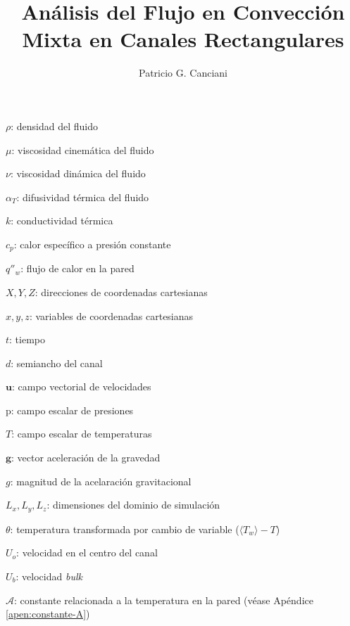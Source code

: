 \documentclass[12pt,screen,twoside]{ibtesis}
\title{Análisis del Flujo en Convección Mixta en Canales Rectangulares}
\author{Patricio G. Canciani}
\begin{document}

\begin{preliminary}



\begin{abreviaturas}
\begin{itemize}
\small{

\item[] $\rho$: densidad del fluido 
\item[] $\mu$: viscosidad cinemática del fluido 
\item[] $\nu$: viscosidad dinámica del fluido
\item[] $\alpha_{T}$: difusividad térmica del fluido 
\item[] $k$: conductividad térmica 
\item[] $c_p$: calor específico a presión constante 
\item[] $q''_w$: flujo de calor en la pared 
\item[] $X,Y,Z$: direcciones de coordenadas cartesianas 
\item[] $x,y,z$: variables de coordenadas cartesianas 
\item[] $t$: tiempo 
\item[] $d$: semiancho del canal 
\item[] $\mathbf{u}$: campo vectorial de velocidades 
\item[] $\text{p}$: campo escalar de presiones 
\item[] $T$: campo escalar de temperaturas 
\item[] $\mathbf{g}$: vector aceleración de la gravedad
\item[] $g$: magnitud de la acelaración gravitacional 
\item[] $L_x,L_y,L_z$: dimensiones del dominio de simulación 
\item[] $\theta$: temperatura transformada por cambio de variable ($\langle T_w \rangle - T$)

\item[] $U_o$: velocidad en el centro del canal 
\item[] $U_b$: velocidad \textit{bulk} 
\item[] $\mathcal{A}$: constante relacionada a la temperatura en la pared (véase Apéndice \ref{apen:constante-A}) 

}
\end{itemize}
\end{abreviaturas}
\end{preliminary}
\end{document}
